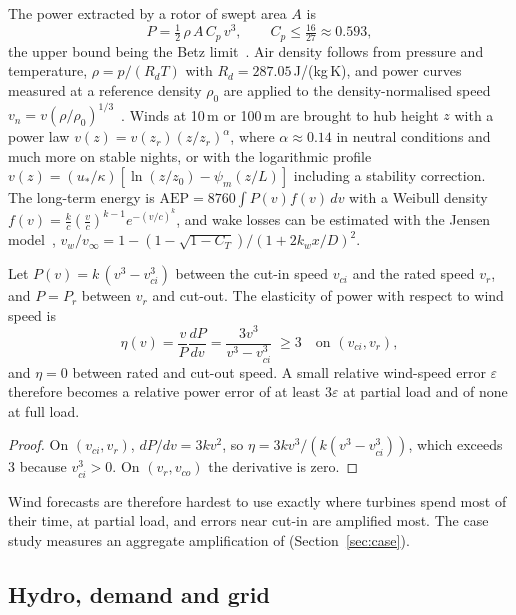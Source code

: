 The power extracted by a rotor of swept area $A$ is
\begin{equation}
P=\tfrac12\,\rho\,A\,C_p\,v^3,\qquad C_p\le\tfrac{16}{27}\approx0.593, \label{eq:windpower}
\end{equation}
the upper bound being the Betz limit~\cite{burton2011handbook}. Air density follows from pressure and temperature, $\rho=p/(R_dT)$ with $R_d=287.05$\,J/(kg\,K), and power curves measured at a reference density $\rho_0$ are applied to the density-normalised speed $v_n=v(\rho/\rho_0)^{1/3}$~\cite{iec61400-12-1}. Winds at 10\,m or 100\,m are brought to hub height $z$ with a power law $v(z)=v(z_r)(z/z_r)^\alpha$, where $\alpha\approx0.14$ in neutral conditions and much more on stable nights, or with the logarithmic profile $v(z)=(u_*/\kappa)[\ln(z/z_0)-\psi_m(z/L)]$ including a stability correction. The long-term energy is $\text{AEP}=8760\int P(v)f(v)\,dv$ with a Weibull density $f(v)=\frac{k}{c}(\frac{v}{c})^{k-1}e^{-(v/c)^k}$, and wake losses can be estimated with the Jensen model~\cite{jensen1983note}, $v_w/v_\infty=1-(1-\sqrt{1-C_T})/(1+2k_wx/D)^2$.

\begin{proposition}
\label{prop:cubic}
Let $P(v)=k\,(v^3-v_{ci}^3)$ between the cut-in speed $v_{ci}$ and the rated speed $v_r$, and $P=P_r$ between $v_r$ and cut-out. The elasticity of power with respect to wind speed is
\begin{equation}
\eta(v)=\frac{v}{P}\frac{dP}{dv}=\frac{3v^3}{v^3-v_{ci}^3}\;\ge 3 \quad\text{on }(v_{ci},v_r),
\end{equation}
and $\eta=0$ between rated and cut-out speed. A small relative wind-speed error $\varepsilon$ therefore becomes a relative power error of at least $3\varepsilon$ at partial load and of none at full load.
\end{proposition}
\begin{proof}
On $(v_{ci},v_r)$, $dP/dv=3kv^2$, so $\eta=3kv^3/(k(v^3-v_{ci}^3))$, which exceeds 3 because $v_{ci}^3>0$. On $(v_r,v_{co})$ the derivative is zero.
\end{proof}

Wind forecasts are therefore hardest to use exactly where turbines spend most of their time, at partial load, and errors near cut-in are amplified most. The case study measures an aggregate amplification of \valAmplificationDA{} (Section~\ref{sec:case}).

\subsection{Hydro, demand and grid}

